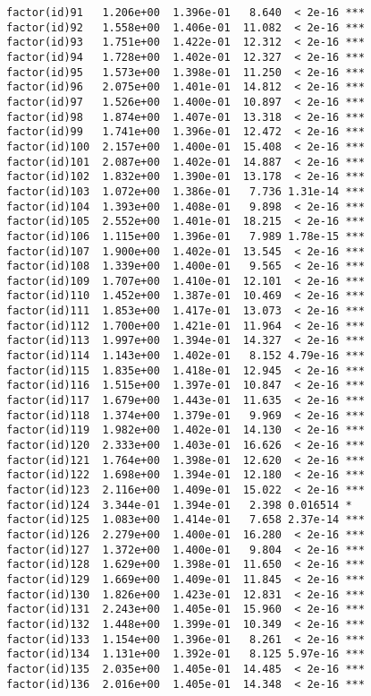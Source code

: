 \documentclass[]{article}
\begin{document}
\begin{verbatim}
factor(id)91   1.206e+00  1.396e-01   8.640  < 2e-16 ***
factor(id)92   1.558e+00  1.406e-01  11.082  < 2e-16 ***
factor(id)93   1.751e+00  1.422e-01  12.312  < 2e-16 ***
factor(id)94   1.728e+00  1.402e-01  12.327  < 2e-16 ***
factor(id)95   1.573e+00  1.398e-01  11.250  < 2e-16 ***
factor(id)96   2.075e+00  1.401e-01  14.812  < 2e-16 ***
factor(id)97   1.526e+00  1.400e-01  10.897  < 2e-16 ***
factor(id)98   1.874e+00  1.407e-01  13.318  < 2e-16 ***
factor(id)99   1.741e+00  1.396e-01  12.472  < 2e-16 ***
factor(id)100  2.157e+00  1.400e-01  15.408  < 2e-16 ***
factor(id)101  2.087e+00  1.402e-01  14.887  < 2e-16 ***
factor(id)102  1.832e+00  1.390e-01  13.178  < 2e-16 ***
factor(id)103  1.072e+00  1.386e-01   7.736 1.31e-14 ***
factor(id)104  1.393e+00  1.408e-01   9.898  < 2e-16 ***
factor(id)105  2.552e+00  1.401e-01  18.215  < 2e-16 ***
factor(id)106  1.115e+00  1.396e-01   7.989 1.78e-15 ***
factor(id)107  1.900e+00  1.402e-01  13.545  < 2e-16 ***
factor(id)108  1.339e+00  1.400e-01   9.565  < 2e-16 ***
factor(id)109  1.707e+00  1.410e-01  12.101  < 2e-16 ***
factor(id)110  1.452e+00  1.387e-01  10.469  < 2e-16 ***
factor(id)111  1.853e+00  1.417e-01  13.073  < 2e-16 ***
factor(id)112  1.700e+00  1.421e-01  11.964  < 2e-16 ***
factor(id)113  1.997e+00  1.394e-01  14.327  < 2e-16 ***
factor(id)114  1.143e+00  1.402e-01   8.152 4.79e-16 ***
factor(id)115  1.835e+00  1.418e-01  12.945  < 2e-16 ***
factor(id)116  1.515e+00  1.397e-01  10.847  < 2e-16 ***
factor(id)117  1.679e+00  1.443e-01  11.635  < 2e-16 ***
factor(id)118  1.374e+00  1.379e-01   9.969  < 2e-16 ***
factor(id)119  1.982e+00  1.402e-01  14.130  < 2e-16 ***
factor(id)120  2.333e+00  1.403e-01  16.626  < 2e-16 ***
factor(id)121  1.764e+00  1.398e-01  12.620  < 2e-16 ***
factor(id)122  1.698e+00  1.394e-01  12.180  < 2e-16 ***
factor(id)123  2.116e+00  1.409e-01  15.022  < 2e-16 ***
factor(id)124  3.344e-01  1.394e-01   2.398 0.016514 *  
factor(id)125  1.083e+00  1.414e-01   7.658 2.37e-14 ***
factor(id)126  2.279e+00  1.400e-01  16.280  < 2e-16 ***
factor(id)127  1.372e+00  1.400e-01   9.804  < 2e-16 ***
factor(id)128  1.629e+00  1.398e-01  11.650  < 2e-16 ***
factor(id)129  1.669e+00  1.409e-01  11.845  < 2e-16 ***
factor(id)130  1.826e+00  1.423e-01  12.831  < 2e-16 ***
factor(id)131  2.243e+00  1.405e-01  15.960  < 2e-16 ***
factor(id)132  1.448e+00  1.399e-01  10.349  < 2e-16 ***
factor(id)133  1.154e+00  1.396e-01   8.261  < 2e-16 ***
factor(id)134  1.131e+00  1.392e-01   8.125 5.97e-16 ***
factor(id)135  2.035e+00  1.405e-01  14.485  < 2e-16 ***
factor(id)136  2.016e+00  1.405e-01  14.348  < 2e-16 ***

\end{verbatim}
\end{document}
